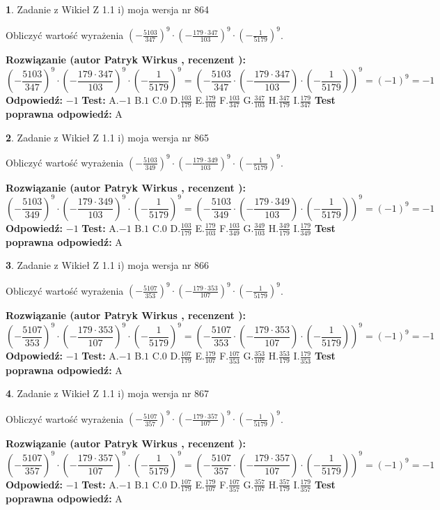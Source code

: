 \documentclass[12pt, a4paper]{article}
\theoremstyle{definition} %
\newtheorem{zad}{}
\newcommand{\zadStart}[1]{\begin{zad}#1\newline}
\newcommand{\zadStop}{\end{zad}}
\newcommand{\rozwStart}[2]{\noindent \textbf{Rozwiązanie (autor #1 , recenzent #2): }\newline}
\newcommand{\rozwStop}{\newline}
\newcommand{\odpStart}{\noindent \textbf{Odpowiedź:}\newline}
\newcommand{\odpStop}{\newline}
\newcommand{\testStart}{\noindent \textbf{Test:}\newline}
\newcommand{\testStop}{\newline}
\newcommand{\kluczStart}{\noindent \textbf{Test poprawna odpowiedź:}\newline}
\newcommand{\kluczStop}{\newline}
\begin{document}
\zadStart{Zadanie z Wikieł Z 1.1 i) moja wersja nr 864}

Obliczyć wartość wyrażenia $(-\frac{5103}{347})^{9} \cdot (-\frac{179 \cdot 347}{103})^{9} \cdot (-\frac{1}{5179})^{9}$.
\zadStop
\rozwStart{Patryk Wirkus}{}
$$(-\frac{5103}{347})^{9} \cdot (-\frac{179 \cdot 347}{103})^{9} \cdot (-\frac{1}{5179})^{9} = (-\frac{5103}{347} \cdot (-\frac{179 \cdot 347}{103}) \cdot (-\frac{1}{5179}))^{9} = (-1)^{9} = -1$$
\rozwStop
\odpStart
$-1$
\odpStop
\testStart
A.$-1$ B.$1$ C.$0$ D.$\frac{103}{179}$ E.$\frac{179}{103}$
F.$\frac{103}{347}$ G.$\frac{347}{103}$
H.$\frac{347}{179}$
I.$\frac{179}{347}$
\testStop
\kluczStart
A
\kluczStop



\zadStart{Zadanie z Wikieł Z 1.1 i) moja wersja nr 865}

Obliczyć wartość wyrażenia $(-\frac{5103}{349})^{9} \cdot (-\frac{179 \cdot 349}{103})^{9} \cdot (-\frac{1}{5179})^{9}$.
\zadStop
\rozwStart{Patryk Wirkus}{}
$$(-\frac{5103}{349})^{9} \cdot (-\frac{179 \cdot 349}{103})^{9} \cdot (-\frac{1}{5179})^{9} = (-\frac{5103}{349} \cdot (-\frac{179 \cdot 349}{103}) \cdot (-\frac{1}{5179}))^{9} = (-1)^{9} = -1$$
\rozwStop
\odpStart
$-1$
\odpStop
\testStart
A.$-1$ B.$1$ C.$0$ D.$\frac{103}{179}$ E.$\frac{179}{103}$
F.$\frac{103}{349}$ G.$\frac{349}{103}$
H.$\frac{349}{179}$
I.$\frac{179}{349}$
\testStop
\kluczStart
A
\kluczStop



\zadStart{Zadanie z Wikieł Z 1.1 i) moja wersja nr 866}

Obliczyć wartość wyrażenia $(-\frac{5107}{353})^{9} \cdot (-\frac{179 \cdot 353}{107})^{9} \cdot (-\frac{1}{5179})^{9}$.
\zadStop
\rozwStart{Patryk Wirkus}{}
$$(-\frac{5107}{353})^{9} \cdot (-\frac{179 \cdot 353}{107})^{9} \cdot (-\frac{1}{5179})^{9} = (-\frac{5107}{353} \cdot (-\frac{179 \cdot 353}{107}) \cdot (-\frac{1}{5179}))^{9} = (-1)^{9} = -1$$
\rozwStop
\odpStart
$-1$
\odpStop
\testStart
A.$-1$ B.$1$ C.$0$ D.$\frac{107}{179}$ E.$\frac{179}{107}$
F.$\frac{107}{353}$ G.$\frac{353}{107}$
H.$\frac{353}{179}$
I.$\frac{179}{353}$
\testStop
\kluczStart
A
\kluczStop



\zadStart{Zadanie z Wikieł Z 1.1 i) moja wersja nr 867}

Obliczyć wartość wyrażenia $(-\frac{5107}{357})^{9} \cdot (-\frac{179 \cdot 357}{107})^{9} \cdot (-\frac{1}{5179})^{9}$.
\zadStop
\rozwStart{Patryk Wirkus}{}
$$(-\frac{5107}{357})^{9} \cdot (-\frac{179 \cdot 357}{107})^{9} \cdot (-\frac{1}{5179})^{9} = (-\frac{5107}{357} \cdot (-\frac{179 \cdot 357}{107}) \cdot (-\frac{1}{5179}))^{9} = (-1)^{9} = -1$$
\rozwStop
\odpStart
$-1$
\odpStop
\testStart
A.$-1$ B.$1$ C.$0$ D.$\frac{107}{179}$ E.$\frac{179}{107}$
F.$\frac{107}{357}$ G.$\frac{357}{107}$
H.$\frac{357}{179}$
I.$\frac{179}{357}$
\testStop
\kluczStart
A
\kluczStop
\end{document}
